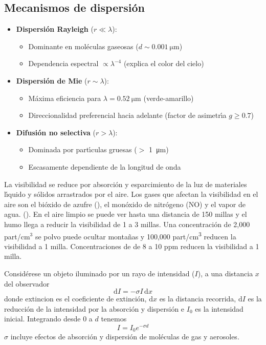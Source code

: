 \subsection{Mecanismos de dispersi\'on}\label{mddis}
\begin{itemize}
    \item \textbf{Dispersi\'on Rayleigh} ($r \ll \lambda$):
    \begin{itemize}
        \item Dominante en mol\'eculas gaseosas ($d \sim \SI{0.001}{\micro\metre}$)
        \item Dependencia espectral $\propto \lambda^{-4}$ (explica el color del cielo)
    \end{itemize}
    
    \item \textbf{Dispersi\'on de Mie} ($r \sim \lambda$):
    \begin{itemize}
        \item M\'axima eficiencia para $\lambda = \SI{0.52}{\micro\metre}$ (verde-amarillo)
        \item Direccionalidad preferencial hacia adelante (factor de asimetr\'{\i}a $g \geq 0.7$)
    \end{itemize}
    
    \item \textbf{Difusi\'on no selectiva} ($r > \lambda$):
    \begin{itemize}
        \item Dominada por part\'{\i}culas gruesas ($>$ \SI{1}{\micro\metre})
        \item Escasamente dependiente de la longitud de onda
    \end{itemize}
\end{itemize}

La visibilidad se reduce por absorci\'on y esparcimiento de la luz de  materiales l\'{\i}quido y s\'olidos arrastrados por el aire. Los gases que afectan la visibilidad en el aire son el bi\'oxido de azufre (), el mon\'oxido de nitr\'ogeno (NO) y el vapor de agua. (). En el aire limpio se puede ver hasta una distancia de 150 millas y el humo llega a reducir la visibilidad de 1 a 3 millas. Una concentraci\'on de 2,000 part/cm$^3$ se polvo puede ocultar monta\~nas y 100,000 part/\si{\cubic\centi\metre} reducen la visibilidad a 1 milla. Concentraciones de  de 8 a 10 ppm reducen la visibilidad a 1 milla.

Consid\'erese un objeto iluminado por un rayo de intensidad ($I$), a una distancia $x$ del observador
\begin{equation}
\mathrm{d}I=-\sigma I\, \mathrm{d}x
\end{equation}
donde \gls{extincion} es el coeficiente de extinci\'on, $\mathrm{d}x$ es la distancia recorrida, $\mathrm{d}I$ es la reducci\'on de la intensidad por la absorci\'on y dispersi\'on e $I_0$ es la intensidad inicial. Integrando desde 0 a $d$ tenemos
\begin{equation}
I =I_0 e^{-\sigma d}
\end{equation}
$\sigma$ incluye efectos de absorci\'on y dispersi\'on de mol\'eculas de gas y aerosoles.

